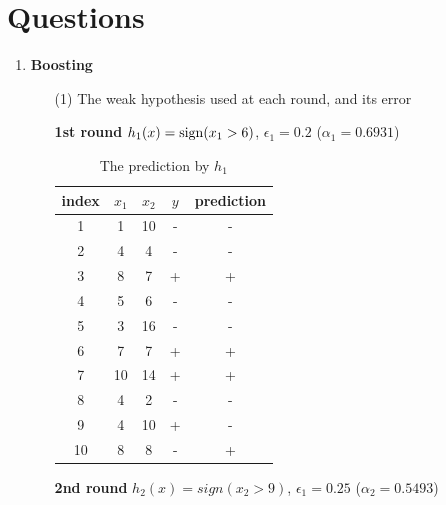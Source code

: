

\oddsidemargin 0in
\evensidemargin 0in
\textwidth 6.5in
\topmargin -0.5in
\textheight 9.0in




\pagestyle{myheadings}  %

\section*{Questions}

\begin{enumerate}
\item {\bf Boosting}

\begin{enumerate}
\item[(1)] The weak hypothesis used at each round, and its error

{\bf 1st round} $h_1(x)={\rm sign} (x_1>6)$, $\epsilon_1=0.2$ ($\alpha_1=0.6931$)

\begin{table}[htb]
  \begin{center}
  \begin{tabular}{|c|c|c|c|c|} \hline
    index & $x_1$ & $x_2$ & $y$ & prediction \\ \hline
    1 & 1 & 10 & - & - \\ \hline
    2 & 4 & 4 & - & -\\ \hline
    3 & 8 & 7 & + & + \\ \hline
    4 & 5 & 6 & - & - \\ \hline
    5 & 3 & 16 & - & - \\ \hline
    6 & 7 & 7 & + & + \\ \hline
    7 & 10 & 14 & + & + \\ \hline
    8 & 4 & 2 & - & - \\ \hline
    9 & 4 & 10 & + & - \\ \hline
    10 & 8 & 8 & - & + \\ \hline
  \end{tabular}
  \caption{The prediction by $h_1$}
  \label{tab:1st_round_prediction}
  \end{center}
\end{table}

{\bf 2nd round} $h_2(x)=sign (x_2>9)$, $\epsilon_1=0.25$ ($\alpha_2=0.5493$)


\end{enumerate}
\end{enumerate}
